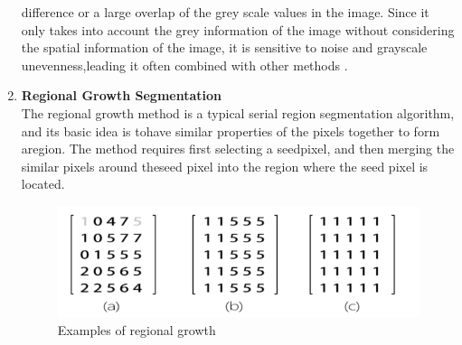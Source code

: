 \begin{enumerate}[label=(\alph*)]
                difference or a large overlap of the grey scale values in the image. Since it only takes into
                account the grey information of the image without considering the spatial information of the image,
                it is sensitive to noise and grayscale unevenness,leading it often combined with other methods \cite{1.18}.
                \item \textbf{Regional Growth Segmentation}\\
                The regional growth method is a typical serial region segmentation algorithm, and its basic idea
                is tohave similar properties of the pixels together to form aregion. The method requires first
                selecting a seedpixel, and then merging the similar pixels around theseed pixel into the region
                where the seed pixel is located.\\
                \vspace{1cm}
                \begin{figure}[h]
                        \centering
                        \includegraphics[width=12cm]{chapiter1/figures/regional.png}
                        \setlength{\fboxrule}{2pt}
                        \caption{Examples of regional growth}
                        \label{fig:figure1.14}
                \end{figure}


\end{enumerate}
